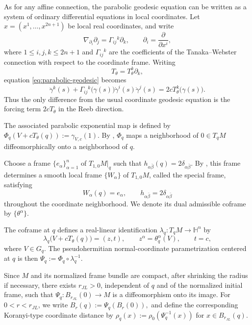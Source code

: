 \documentclass[11pt]{article}
\numberwithin{equation}{section}
\numberwithin{equation}{section}
\begin{document}
As for any affine connection, the parabolic geodesic equation can be written as a system of ordinary differential equations in local coordinates. Let \(x=(x^1,\ldots,x^{2n+1})\) be local real coordinates, and write
\[
\nabla_{\partial_i}\partial_j
=
\Gamma_{ij}{}^k\partial_k,
\qquad
\partial_i=\frac{\partial}{\partial x^i},
\]
where \(1\leq i,j,k\leq 2n+1\) and \(\Gamma_{ij}{}^k\) are the coefficients of the Tanaka--Webster connection with respect to the coordinate frame. Writing
\[
T_\theta=T_\theta^k\partial_k,
\]
equation \eqref{eq:parabolic-geodesic} becomes
\begin{equation}\label{eq:parabolic-geodesic-local}
\ddot{\gamma}^k(s)
+
\Gamma_{ij}{}^k\bigl(\gamma(s)\bigr)
\dot{\gamma}^i(s)\dot{\gamma}^j(s)
=
2cT_\theta^k\bigl(\gamma(s)\bigr).
\end{equation}
Thus the only difference from the usual coordinate geodesic equation is the forcing term \(2cT_\theta\) in the Reeb direction.

The associated parabolic exponential map is defined by
\(
\Phi_q(V+cT_\theta(q))
:=
\gamma_{V,c}(1).
\)
By \cite[Theorem~2.1]{JL1989}, \(\Phi_q\) maps a neighborhood of
\(0\in T_qM\) diffeomorphically onto a neighborhood of \(q\).

Choose a frame \(\{e_\alpha\}_{\alpha=1}^n\) of \(T_{1,0}M|_q\) such that
\(
h_{\alpha\bar\beta}(q)=2\delta_{\alpha\bar\beta}.
\)
By \cite[Proposition~2.3]{JL1989}, this frame determines a smooth local
frame \(\{W_\alpha\}\) of \(T_{1,0}M\), called the special frame, satisfying
\[
W_\alpha(q)=e_\alpha,
\qquad
h_{\alpha\bar\beta}=2\delta_{\alpha\bar\beta}
\]
throughout the coordinate neighborhood.  We denote its dual admissible
coframe by \(\{\theta^\alpha\}\).

The coframe at \(q\) defines a real-linear identification
\(
\lambda_q:T_qM\longrightarrow\mathbb H^n
\)
by
\[
\lambda_q\bigl(V+cT_\theta(q)\bigr)=(z,t),
\qquad
z^\alpha=\theta_q^\alpha(V),
\qquad
t=c,
\]
where \(V\in G_q\).  The pseudohermitian normal-coordinate parametrization
centered at \(q\) is then
\(
\Psi_q:=\Phi_q\circ\lambda_q^{-1}.
\)

Since \(M\) and its normalized frame bundle are compact, after shrinking the
radius if necessary, there exists \(r_{JL}>0\), independent of \(q\) and of
the normalized initial frame, such that
\(
\Psi_q:B_{r_{JL}}(0)\longrightarrow M
\)
is a diffeomorphism onto its image.  For \(0<r<r_{JL}\), we write
\(
B_r(q):=\Psi_q(B_r(0)),
\)
and define the corresponding Koranyi-type coordinate distance by
\(
\rho_q(x):=\rho_0(\Psi_q^{-1}(x))
\) for \(x\in B_{r_{JL}}(q)\).
\end{document}
